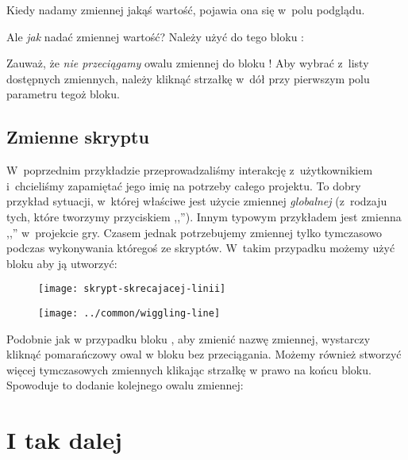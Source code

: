 \documentclass[a4paper]{report}
\begin{document}

Kiedy nadamy zmiennej jakąś wartość, pojawia ona się w~polu podglądu.

Ale \emph{jak} nadać zmiennej wartość? Należy użyć do tego bloku :\nopagebreak


Zauważ, że \emph{nie przeciągamy} owalu zmiennej do bloku ! Aby wybrać z~listy dostępnych zmiennych, należy kliknąć strzałkę w~dół przy pierwszym polu parametru tegoż bloku.

\subsection{Zmienne skryptu}

W~poprzednim przykładzie przeprowadzaliśmy interakcję z~użytkownikiem i~chcieliśmy zapamiętać jego imię na potrzeby całego projektu. To dobry przykład sytuacji, w~której właściwe jest użycie zmiennej \emph{globalnej} (z~rodzaju tych, które tworzymy przyciskiem ,,''). Innym typowym przykładem jest zmienna ,,'' w~projekcie gry. Czasem jednak potrzebujemy zmiennej tylko tymczasowo podczas wykonywania któregoś ze skryptów. W~takim przypadku możemy użyć bloku  aby ją utworzyć:\nopagebreak

\begin{figure}[H]
\begin{minipage}{0.5\textwidth}
\centering
\texttt{[image: skrypt-skrecajacej-linii]}%
\end{minipage}%
\begin{minipage}{0.5\textwidth}
\centering
\texttt{[image: ../common/wiggling-line]}
\end{minipage}%
\end{figure}

Podobnie jak w przypadku bloku , aby zmienić nazwę zmiennej, wystarczy kliknąć pomarańczowy owal w bloku  bez przeciągania. Możemy również stworzyć więcej tymczasowych zmiennych klikając strzałkę w prawo na końcu bloku. Spowoduje to dodanie kolejnego owalu zmiennej:\nopagebreak


\section{I tak dalej}
\end{document}
